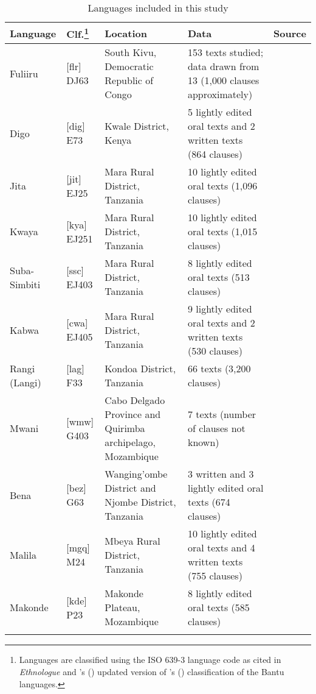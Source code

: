 \documentclass[output=paper]{langsci/langscibook}
\begin{document}
\begin{table}
\small
{}
\begin{tabularx}{\textwidth}{p{1.5cm}p{1cm}QQp{2cm}}
\lsptoprule
Language & Clf.\footnote{Languages are classified using the ISO 639-3 language code as cited in \textit{Ethnologue} \citep{lewisetal2015} and \citeauthor{maho2003}’s (\citeyear{maho2003}) updated version of \citeauthor{guthrie1967}’s (\citeyear{guthrie1967}) classification of the Bantu languages.}
			    & Location & Data & Source\\
\midrule
Fuliiru & [flr] DJ63 & South Kivu, Democratic Republic of Congo & 153 texts studied; data drawn from 13 (1,000 clauses approximately) & \citet{vanotterloo2011,vanotterloo2015}\\
 Digo & [dig] E73 & Kwale District, Kenya & 5 lightly edited oral texts and 2 written texts (864 clauses) & \citet{nicolle2015a}\\
 Jita & [jit] EJ25 & Mara Rural District, Tanzania & 10 lightly edited oral texts (1,096 clauses) & \citet{pylerobinson2015}\\
 Kwaya & [kya] EJ251 & Mara Rural District, Tanzania & 10 lightly edited oral texts (1,015 clauses) & \citet{odom2015}\\
 Suba-Simbiti & [ssc] EJ403 & Mara Rural District, Tanzania & 8 lightly edited oral texts (513 clauses) & \citet{masatu2015}\\
 Kabwa & [cwa] EJ405 & Mara Rural District, Tanzania & 9 lightly edited oral texts and 2 written texts (530 clauses) & \citet{walker2011}\\
 Rangi (Langi) & [lag] F33 & Kondoa District, Tanzania & 66 texts (3,200 clauses) & \citet{Stegen2011}\\
 Mwani & [wmw] G403 & Cabo Delgado Province and Quirimba archipelago, Mozambique & 7 texts (number of clauses not known) & \citet{floor2005}\\
 Bena & [bez] G63 & Wanging’ombe District and Njombe District, Tanzania & 3 written and 3 lightly edited oral texts (674 clauses) & \citet{broomhall2011,eaton2015a}\\
 Malila & [mgq] M24 & Mbeya Rural District, Tanzania & 10 lightly edited oral texts and 4 written texts (755 clauses) & \citet{eaton2015b}\\
 Makonde & [kde] P23 & Makonde Plateau, Mozambique & 8 lightly edited oral texts (585 clauses) & \citet{leach2015}\\

\lspbottomrule
\end{tabularx}

\caption{Languages included in this study}	
\label{tab:1.nicolle}
\end{table}
\end{document}
